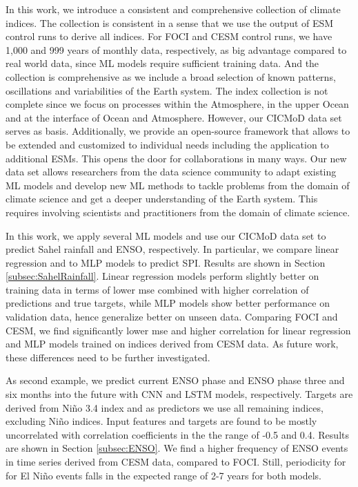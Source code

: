 \documentclass{CUP-JNL-DTM}%
\theoremstyle{definition}
\numberwithin{equation}{section}
\begin{document}
In this work, we introduce a consistent and comprehensive collection of climate indices. The collection is consistent in a sense that we use the output of ESM control runs to derive all indices. For FOCI and CESM control runs, we have 1,000 and 999 years of monthly data, respectively, as big advantage compared to real world data, since ML models require sufficient training data. And the collection is comprehensive as we include a broad selection of known patterns, oscillations and variabilities of the Earth system. The index collection is not complete since we focus on processes within the Atmosphere, in the upper Ocean and at the interface of Ocean and Atmosphere. However, our CICMoD data set serves as basis. Additionally, we provide an open-source framework that allows to be extended and customized to individual needs including the application to additional ESMs. This opens the door for collaborations in many ways. Our new data set allows researchers from the data science community to adapt existing ML models and develop new ML methods to tackle problems from the domain of climate science and get a deeper understanding of the Earth system. This requires involving scientists and practitioners from the domain of climate science.

In this work, we apply several ML models and use our CICMoD data set to predict Sahel rainfall and ENSO, respectively. In particular, we compare linear regression and to MLP models to predict SPI. Results are shown in Section \ref{subsec:SahelRainfall}. Linear regression models perform slightly better on training data in terms of lower mse combined with higher correlation of predictions and true targets, while MLP models show better performance on validation data, hence generalize better on unseen data. Comparing FOCI and CESM, we find significantly lower mse and higher correlation for linear regression and MLP models trained on indices derived from CESM data. As future work, these differences need to be further investigated. 

As second example, we predict current ENSO phase and ENSO phase three and six months into the future with CNN and LSTM models, respectively. Targets are derived from Ni\~{n}o 3.4 index and as predictors we use all remaining indices, excluding Ni\~{n}o indices. Input features and targets are found to be mostly uncorrelated with correlation coefficients in the the range of -0.5 and 0.4. Results are shown in Section \ref{subsec:ENSO}. We find a higher frequency of ENSO events in time series derived from CESM data, compared to FOCI. Still, periodicity for for El Ni\~{n}o events falls in the expected range of 2-7 years for both models. 
\end{document}
